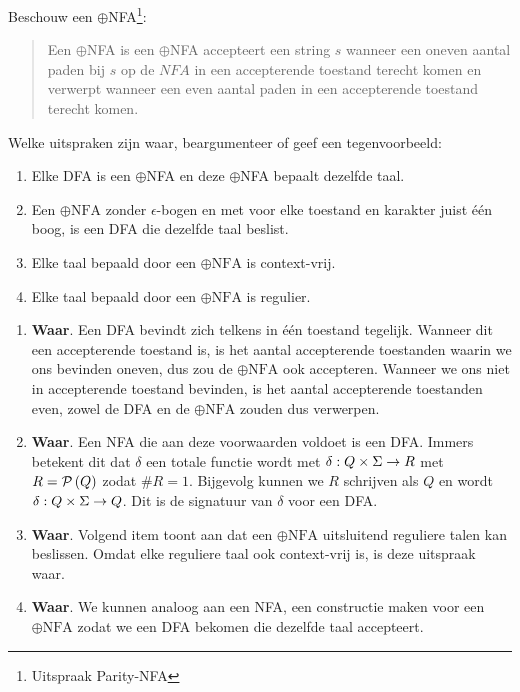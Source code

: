 \documentclass{article}
\begin{document}
\begin{question}
Beschouw een $\oplus$NFA\footnote{Uitspraak Parity-NFA}:
\begin{quote}
\begin{definition}
Een $\oplus$NFA is een $\oplus$NFA accepteert een string $s$ wanneer een oneven aantal paden bij $s$ op de $NFA$ in een accepterende toestand terecht komen en verwerpt wanneer een even aantal paden in een accepterende toestand terecht komen.
\end{definition}
\end{quote}
Welke uitspraken zijn waar, beargumenteer of geef een tegenvoorbeeld:
\begin{enumerate}
 \item Elke DFA is een $\oplus$NFA en deze $\oplus$NFA bepaalt dezelfde taal.
 \item Een $\oplus\mbox{NFA}$ zonder $\epsilon$-bogen en met voor elke toestand en karakter juist \'e\'en boog, is een DFA die dezelfde taal beslist.
 \item Elke taal bepaald door een $\oplus\mbox{NFA}$ is context-vrij.
 \item Elke taal bepaald door een $\oplus\mbox{NFA}$ is regulier.
\end{enumerate}
\begin{answer}
\begin{enumerate}
 \item \textbf{Waar}. Een DFA bevindt zich telkens in \'e\'en toestand tegelijk. Wanneer dit een accepterende toestand is, is het aantal accepterende toestanden waarin we ons bevinden oneven, dus zou de $\oplus\mbox{NFA}$ ook accepteren. Wanneer we ons niet in accepterende toestand bevinden, is het aantal accepterende toestanden even, zowel de DFA en de $\oplus\mbox{NFA}$ zouden dus verwerpen.
 \item \textbf{Waar}. Een NFA die aan deze voorwaarden voldoet is een DFA. Immers betekent dit dat $\delta$ een totale functie wordt met $\delta:Q\times\Sigma\rightarrow R$ met $R=\mathcal{P}\left( Q \right)$ zodat $\# R=1$. Bijgevolg kunnen we $R$ schrijven als $Q$ en wordt $\delta:Q\times\Sigma\rightarrow Q$. Dit is de signatuur van $\delta$ voor een DFA.
 \item \textbf{Waar}. Volgend item toont aan dat een $\oplus\mbox{NFA}$ uitsluitend reguliere talen kan beslissen. Omdat elke reguliere taal ook context-vrij is, is deze uitspraak waar.
 \item \textbf{Waar}. We kunnen analoog aan een NFA, een constructie maken voor een $\oplus\mbox{NFA}$ zodat we een DFA bekomen die dezelfde taal accepteert.

\end{enumerate}
\end{answer}
\end{question}
\end{document}
